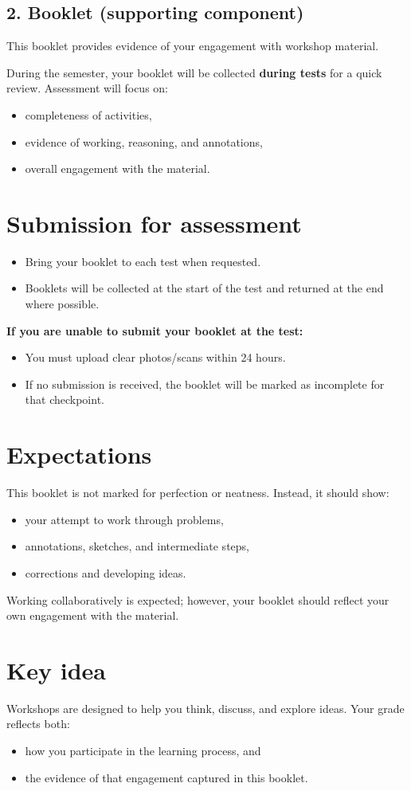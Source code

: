 \subsection*{2. Booklet (supporting component)}
This booklet provides evidence of your engagement with workshop material.

During the semester, your booklet will be collected \textbf{during tests}  for a quick review. Assessment will focus on:
\begin{itemize}
    \item completeness of activities,
    \item evidence of working, reasoning, and annotations,
    \item overall engagement with the material.
\end{itemize}


\clearpage
\section*{Submission for assessment}
\begin{itemize}
    \item Bring your booklet to each test when requested.
    \item Booklets will be collected at the start of the test and returned at the end where possible.
\end{itemize}

\textbf{If you are unable to submit your booklet at the test:}
\begin{itemize}
    \item You must upload clear photos/scans within 24 hours.
    \item If no submission is received, the booklet will be marked as incomplete for that checkpoint.
\end{itemize}


\section*{Expectations}
This booklet is not marked for perfection or neatness. Instead, it should show:
\begin{itemize}
    \item your attempt to work through problems,
    \item annotations, sketches, and intermediate steps,
    \item corrections and developing ideas.
\end{itemize}

Working collaboratively is expected; however, your booklet should reflect your own engagement with the material.

\section*{Key idea}
Workshops are designed to help you think, discuss, and explore ideas. Your grade reflects both:
\begin{itemize}
    \item how you participate in the learning process, and
    \item the evidence of that engagement captured in this booklet.
\end{itemize}